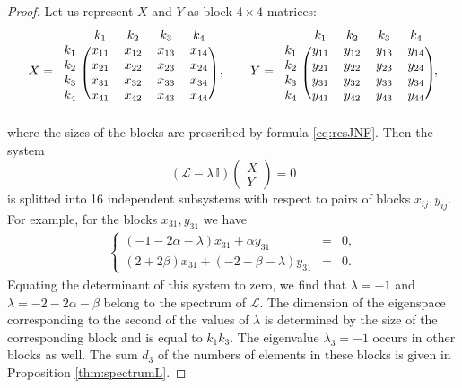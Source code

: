 \documentclass{article}
\theoremstyle{plain}
\newcommand{\brackets}[1]{\left( #1 \right)}
\begin{document}
\begin{proof}
Let us represent $X$ and $Y$ as block $4 \times 4$-matrices:
\begin{gather}
    X
    =
    \begin{blockarray}{ccccc}
      & k_1 & k_2 & k_3 & k_4 \\
    \begin{block}{c(cccc)}
      k_1 & x_{11} & x_{12} & x_{13} & x_{14} \\
      k_2 & x_{21} & x_{22} & x_{23} & x_{24} \\
      k_3 & x_{31} & x_{32} & x_{33} & x_{34} \\
      k_4 & x_{41} & x_{42} & x_{43} & x_{44} \\
    \end{block}
    \end{blockarray}
    \,\, ,
    \qquad
    Y
    = 
    \begin{blockarray}{ccccc}
      & k_1 & k_2 & k_3 & k_4 \\
    \begin{block}{c(cccc)}
      k_1 & y_{11} & y_{12} & y_{13} & y_{14} \\
      k_2 & y_{21} & y_{22} & y_{23} & y_{24} \\
      k_3 & y_{31} & y_{32} & y_{33} & y_{34} \\
      k_4 & y_{41} & y_{42} & y_{43} & y_{44} \\
    \end{block}
    \end{blockarray}
    \, ,
\end{gather}
where the sizes of the blocks are prescribed  by formula \eqref{eq:resJNF}.
Then the system
$$
\brackets{
    \mathcal{L}
    - \lambda \, \mathbb{I}
    }
    \begin{pmatrix}
   X \\[1mm]
   Y
    \end{pmatrix}
    = 
   0
$$
is splitted into 16 independent subsystems with respect to pairs of blocks $x_{ij}, y_{ij}$. For example, for the blocks 
$x_{31}, y_{31}$ 
we have 
\begin{gather*}
    \left\{
    \begin{array}{rcr}
         \left(-1 - 2 \alpha - \lambda\right) x_{31} + \alpha y_{31} & = & 0,  
         \\[2mm]
         \left(2 + 2 \beta\right) x_{31} + \left(-2 - \beta - \lambda\right) y_{31} & = & 0. 
    \end{array}
    \right.
\end{gather*}
Equating the determinant of this system to zero, we find that  $\lambda = -1$ and $\lambda = -2-2 \alpha - \beta$ belong to the spectrum of $\mathcal{L}$. The dimension of the eigenspace corresponding to the second of the values of $\lambda$ is determined by the size of the corresponding block and is equal to $k_1 k_3$. The eigenvalue $\lambda_3 = -1$ occurs in other blocks as well. The sum $d_3$ of the numbers of elements in these blocks is given in Proposition \ref{thm:spectrumL}.
\end{proof}
\end{document}
